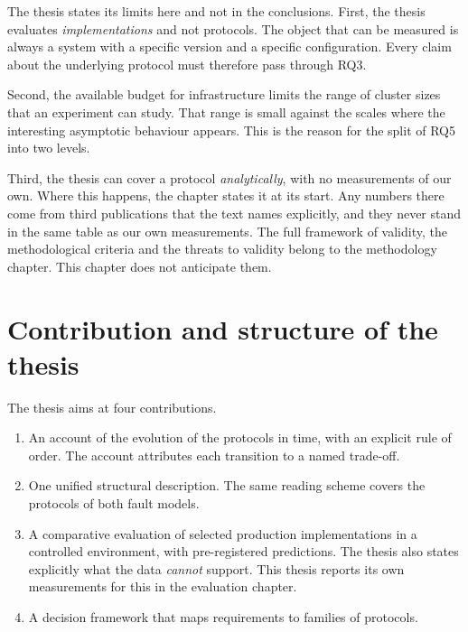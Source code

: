 The thesis states its limits here and not in the conclusions. First, the
thesis evaluates \emph{implementations} and not protocols. The object
that can be measured is always a system with a specific version and a
specific configuration. Every claim about the underlying protocol must
therefore pass through RQ3.

Second, the available budget for infrastructure limits the range of
cluster sizes that an experiment can study. That range is small against
the scales where the interesting asymptotic behaviour appears. This is
the reason for the split of RQ5 into two levels.

Third, the thesis can cover a protocol \emph{analytically}, with no
measurements of our own. Where this happens, the chapter states it at its
start. Any numbers there come from third publications that the text names
explicitly, and they never stand in the same table as our own
measurements. The full framework of validity, the methodological criteria
and the threats to validity belong to the methodology chapter. This
chapter does not anticipate them.

\section{Contribution and structure of the thesis}
\label{sec:structure}

The thesis aims at four contributions.

\begin{enumerate}[label=\textbf{(\alph*)},leftmargin=2.4em]
  \item An account of the evolution of the protocols in time, with an
  explicit rule of order. The account attributes each transition to a
  named trade-off.
  \item One unified structural description. The same reading scheme
  covers the protocols of both fault models.
  \item A comparative evaluation of selected production implementations
  in a controlled environment, with pre-registered predictions. The
  thesis also states explicitly what the data \emph{cannot} support. This
  thesis reports its own measurements for this in the evaluation chapter.
  \item A decision framework that maps requirements to families of
  protocols.
\end{enumerate}

